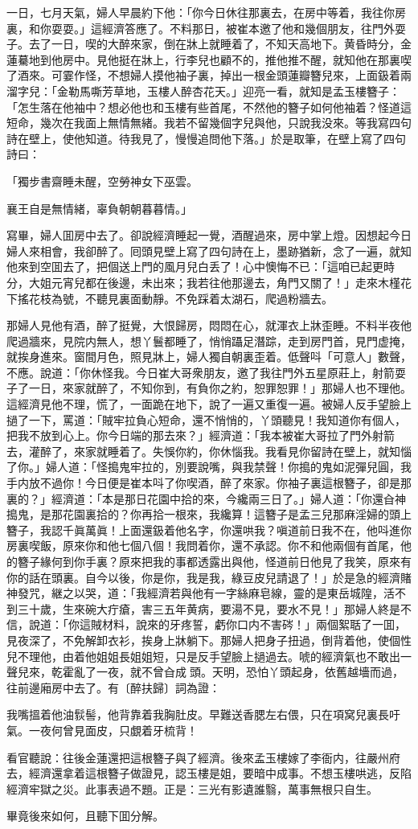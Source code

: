 一日，七月天氣，婦人早晨約下他：「你今日休往那裏去，在房中等着，我往你房裏，和你耍耍。」這經濟答應了。不料那日，被崔本邀了他和幾個朋友，往門外耍子。去了一日，喫的大醉來家，倒在牀上就睡着了，不知天高地下。黄昏時分，金蓮驀地到他房中。見他挺在牀上，行李兒也顧不的，推他推不醒，就知他在那裏喫了酒來。可霎作怪，不想婦人摸他袖子裏，掉出一根金頭蓮瓣簪兒來，上面鈒着兩溜字兒：「金勒馬嘶芳草地，玉樓人醉杏花天。」迎亮一看，就知是孟玉樓簪子：「怎生落在他袖中？想必他也和玉樓有些首尾，不然他的簪子如何他袖着？怪道這短命，幾次在我面上無情無緒。我若不留幾個字兒與他，只說我没來。等我寫四句詩在壁上，使他知道。待我見了，慢慢追問他下落。」於是取筆，在壁上寫了四句詩曰：

\begin{myquote}
「獨步書齋睡未醒，空勞神女下巫雲。

襄王自是無情緒，辜負朝朝暮暮情。」
\end{myquote}

寫畢，婦人囬房中去了。卻說經濟睡起一覺，酒醒過來，房中掌上燈。因想起今日婦人來相會，我卻醉了。囘頭見壁上寫了四句詩在上，墨跡猶新，念了一遍，就知他來到空囬去了，把個送上門的風月兒白丢了！心中懊悔不已：「這咱已起更時分，大姐元宵兒都在後邊，未出來；我若往他那邊去，角門又關了！」走來木槿花下搖花枝為號，不聽見裏面動靜。不免踩着太湖石，爬過粉牆去。

那婦人見他有酒，醉了挺覺，大恨歸房，悶悶在心，就渾衣上牀歪睡。不料半夜他爬過牆來，見院内無人，想丫鬟都睡了，悄悄躡足潛踪，走到房門首，見門虚掩，就挨身進來。窗間月色，照見牀上，婦人獨自朝裏歪着。低聲呌「可意人」數聲，不應。說道：「你休怪我。今日崔大哥衆朋友，邀了我往門外五星原莊上，射箭耍子了一日，來家就醉了，不知你到，有負你之約，恕罪恕罪！」那婦人也不理他。這經濟見他不理，慌了，一面跪在地下，說了一遍又重復一遍。被婦人反手望臉上撾了一下，罵道：「賊牢拉負心短命，還不悄悄的，丫頭聽見！我知道你有個人，把我不放到心上。你今日端的那去來？」經濟道：「我本被崔大哥拉了門外射箭去，灌醉了，來家就睡着了。失悞你約，你休惱我。我看見你留詩在壁上，就知惱了你。」婦人道：「怪搗鬼牢拉的，別要說嘴，與我禁聲！你搗的鬼如泥彈兒圓，我手内放不過你！今日便是崔本呌了你喫酒，醉了來家。你袖子裏這根簪子，卻是那裏的？」經濟道：「本是那日花園中拾的來，今纔兩三日了。」婦人道：「你還㒲神搗鬼，是那花園裏拾的？你再拾一根來，我纔算！這簪子是孟三兒那麻淫婦的頭上簪子，我認千眞萬眞！上面還鈒着他名字，你還哄我？嗔道前日我不在，他呌進你房裏喫飯，原來你和他七個八個！我問着你，還不承認。你不和他兩個有首尾，他的簪子緣何到你手裏？原來把我的事都透露出與他，怪道前日他見了我笑，原來有你的話在頭裏。自今以後，你是你，我是我，綠豆皮兒請退了！」於是急的經濟賭神發咒，継之以哭，道：「我經濟若與他有一字絲麻皂線，靈的是東岳城隍，活不到三十歲，生來碗大疔瘡，害三五年黄病，要湯不見，要水不見！」那婦人終是不信，說道：「你這賊材料，說來的牙疼誓，虧你口内不害硶！」兩個絮聒了一囬，見夜深了，不免解卸衣衫，挨身上牀躺下。那婦人把身子扭過，倒背着他，使個性兒不理他，由着他姐姐長姐姐短，只是反手望臉上撾過去。唬的經濟氣也不敢出一聲兒來，乾霍亂了一夜，就不曾㒲成𣭈頭。天明，恐怕丫頭起身，依舊越墻而過，往前邊廂房中去了。有〔醉扶歸〕詞為證：

\begin{myquote}
我嘴搵着他油䯼髻，他背靠着我胸肚皮。早難送香腮左右偎，只在項窝兒裏長吁氣。一夜何曾見面皮，只覷着牙梳背！
\end{myquote}

看官聽說：往後金蓮還把這根簪子與了經濟。後來孟玉樓嫁了李衙内，往嚴州府去，經濟還拿着這根簪子做證見，認玉樓是姐，要暗中成事。不想玉樓哄逃，反陷經濟牢獄之災。此事表過不題。正是：三光有影遺誰翳，萬事無根只自生。

畢竟後來如何，且聽下囬分解。

